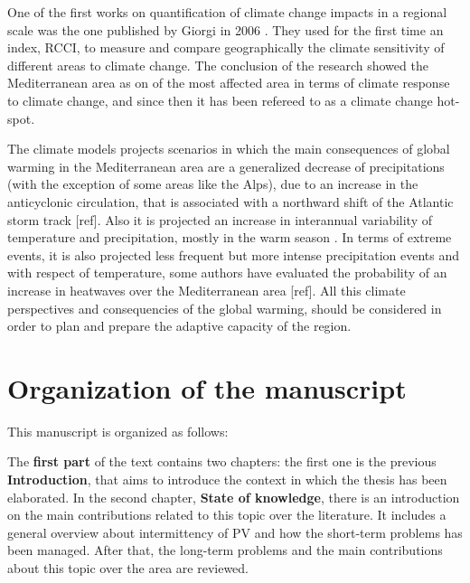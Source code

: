 One of the first works on quantification of climate change impacts in a regional scale was the one published by Giorgi in 2006 \cite*{Giorgi2006}. They used for the first time an index, RCCI, to measure and compare geographically the climate sensitivity of different areas to climate change. The conclusion of the research showed the Mediterranean area as on of the most affected area in terms of climate response to climate change, and since then it has been refereed to as a climate change hot-spot.


The climate models projects scenarios in which the main consequences of global warming in the Mediterranean area are a generalized decrease of precipitations (with the exception of some areas like the Alps), due to an increase in the anticyclonic circulation, that is associated with a northward shift of the Atlantic storm track [ref]. Also it is projected an increase in interannual variability of temperature and precipitation, mostly in the warm season \cite*{Giorgi2008}. In terms of extreme events, it is also projected less frequent but more intense precipitation events and with respect of temperature, some authors have evaluated the probability of an increase in heatwaves over the Mediterranean area [ref]. All this climate perspectives and consequencies of the global warming,  should be considered in order to plan and prepare the adaptive capacity of the region.\\   

\section{Organization of the manuscript}%

This manuscript is organized as follows:

The \textbf{first part} of the text contains two chapters: the first one is the previous \textbf{Introduction}, that aims to introduce the context in which the thesis has been elaborated. In the second chapter, \textbf{State of knowledge}, there is an introduction on the main contributions related to this topic over the literature. It includes a general overview about intermittency of PV and how the short-term problems has been managed. After that, the long-term problems and the main contributions about this topic over the area are reviewed. %

